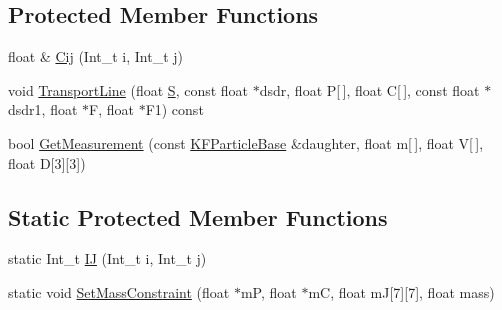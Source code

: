 \subsection*{Protected Member Functions}
\begin{DoxyCompactItemize}
\item 
float \& \hyperlink{classKFParticleBase_aeab9a3989e50d30810c3affb483254c7}{Cij} (Int\+\_\+t i, Int\+\_\+t j)
\item 
void \hyperlink{classKFParticleBase_ad6268b20f07f2ac95af35f8f53175bd7}{Transport\+Line} (float \hyperlink{classKFParticleBase_af9ce6c2176599a02337b472064232841}{S}, const float $\ast$dsdr, float P\mbox{[}$\,$\mbox{]}, float C\mbox{[}$\,$\mbox{]}, const float $\ast$dsdr1, float $\ast$F, float $\ast$F1) const 
\item 
bool \hyperlink{classKFParticleBase_a4589ae9c9872e56468d6c5dc17adcfff}{Get\+Measurement} (const \hyperlink{classKFParticleBase}{K\+F\+Particle\+Base} \&daughter, float m\mbox{[}$\,$\mbox{]}, float V\mbox{[}$\,$\mbox{]}, float D\mbox{[}3\mbox{]}\mbox{[}3\mbox{]})
\end{DoxyCompactItemize}
\subsection*{Static Protected Member Functions}
\begin{DoxyCompactItemize}
\item 
static Int\+\_\+t \hyperlink{classKFParticleBase_ad059627ac0eb3810051cea5fbfdedc77}{IJ} (Int\+\_\+t i, Int\+\_\+t j)
\item 
static void \hyperlink{classKFParticleBase_a5baddbdf1ec37043117de66c5ab31971}{Set\+Mass\+Constraint} (float $\ast$mP, float $\ast$mC, float mJ\mbox{[}7\mbox{]}\mbox{[}7\mbox{]}, float mass)
\end{DoxyCompactItemize}
